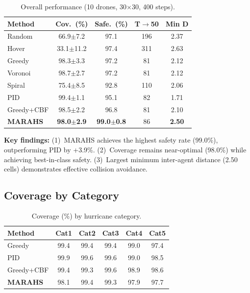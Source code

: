 \documentclass[11pt,twocolumn]{article}
\theoremstyle{definition}
\begin{document}
\begin{table}[t]
\centering
\caption{Overall performance (10 drones, 30$\times$30, 400 steps).}
\label{tab:main}
\small
\begin{tabular}{lcccc}
\toprule
\textbf{Method} & \textbf{Cov.\ (\%)} & \textbf{Safe.\ (\%)} & \textbf{T$\to$50} & \textbf{Min D} \\
\midrule
Random    & 66.9$\pm$7.2  & 97.1 & 196 & 2.37 \\
Hover     & 33.1$\pm$11.2 & 97.4 & 311 & 2.63 \\
Greedy    & 98.3$\pm$3.3  & 97.2 & 81  & 2.12 \\
Voronoi   & 98.7$\pm$2.7  & 97.2 & 81  & 2.12 \\
Spiral    & 75.4$\pm$8.5  & 92.8 & 110 & 2.06 \\
PID       & 99.4$\pm$1.1  & 95.1 & 82  & 1.71 \\
Greedy+CBF& 98.5$\pm$2.2  & 96.8 & 81  & 2.10 \\
\midrule
\textbf{MARAHS} & \textbf{98.0}$\pm$\textbf{2.9} & \textbf{99.0}$\pm$\textbf{0.8} & 86 & \textbf{2.50} \\
\bottomrule
\end{tabular}
\end{table}

\textbf{Key findings:} (1)~MARAHS achieves the highest safety rate (99.0\%), outperforming PID by +3.9\%. (2)~Coverage remains near-optimal (98.0\%) while achieving best-in-class safety. (3)~Largest minimum inter-agent distance (2.50 cells) demonstrates effective collision avoidance.

\subsection{Coverage by Category}

\begin{table}[t]
\centering
\caption{Coverage (\%) by hurricane category.}
\label{tab:cat}
\small
\begin{tabular}{lccccc}
\toprule
\textbf{Method} & \textbf{Cat1} & \textbf{Cat2} & \textbf{Cat3} & \textbf{Cat4} & \textbf{Cat5} \\
\midrule
Greedy     & 99.4 & 99.4 & 99.4 & 99.0 & 97.4 \\
PID        & 99.9 & 99.6 & 99.6 & 99.0 & 98.5 \\
Greedy+CBF & 99.4 & 99.3 & 99.6 & 98.9 & 98.6 \\
\textbf{MARAHS} & 98.1 & 99.4 & 99.3 & 97.9 & 97.7 \\
\bottomrule
\end{tabular}
\end{table}
\end{document}
